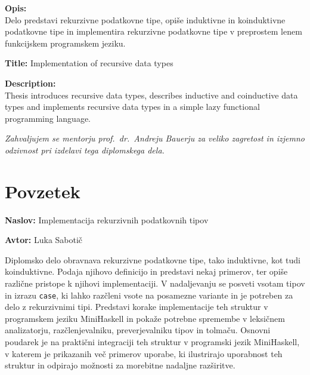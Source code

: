 \documentclass[a4paper,12pt,openright]{book}
\newcommand{\ttitle}{Implementacija rekurzivnih podatkovnih tipov}
\newcommand{\tauthor}{Luka Sabotič}
\newcommand{\clearemptydoublepage}{\newpage{\pagestyle{empty}\cleardoublepage}}
\begin{document}
\bigskip
\noindent\textbf{Opis:}\\
Delo predstavi rekurzivne podatkovne tipe, opiše induktivne in koinduktivne podatkovne tipe in implementira rekurzivne podatkovne tipe v preprostem lenem funkcijskem programskem jeziku.

\bigskip
\noindent\textbf{Title:} Implementation of recursive data types

\bigskip
\noindent\textbf{Description:}\\
Thesis introduces recursive data types, describes inductive and coinductive data types and implements recursive data types in a simple lazy functional programming language.

\vfill



\vspace{2cm}

\clearemptydoublepage

\thispagestyle{empty}\mbox{}\vfill\null\it%
\noindent
Zahvaljujem se mentorju prof.\ dr.\ Andreju Bauerju za veliko zagretost in izjemno odzivnost pri izdelavi tega diplomskega dela.
\rm\normalfont

\clearemptydoublepage

\thispagestyle{empty}\mbox{}{\textheight}\mbox{}\hfill\begin{minipage}{0.55\textwidth}%
\normalfont\end{minipage}

\clearemptydoublepage


\pagestyle{empty}
\def\thepage{}%
\tableofcontents{}


\clearemptydoublepage


{}
\chapter*{Povzetek}

\noindent\textbf{Naslov:} \ttitle
\bigskip

\noindent\textbf{Avtor:} \tauthor
\bigskip

\noindent Diplomsko delo obravnava rekurzivne podatkovne tipe, tako induktivne, kot tudi koinduktivne. Podaja njihovo definicijo in predstavi nekaj 
primerov, ter opiše različne pristope k njihovi implementaciji. V nadaljevanju se posveti vsotam tipov in izrazu \lstinline{case}, ki lahko razčleni 
vsote na posamezne variante in je potreben za delo z rekurzivnimi tipi. Predstavi korake implementacije teh struktur v programskem jeziku 
MiniHaskell in pokaže potrebne spremembe v leksičnem analizatorju, razčlenjevalniku, preverjevalniku tipov in tolmaču. Osnovni poudarek je 
na praktični integraciji teh struktur v programski jezik MiniHaskell, v katerem je prikazanih več primerov uporabe, ki ilustrirajo uporabnost 
teh struktur in odpirajo možnosti za morebitne nadaljne razširitve.
\end{document}
